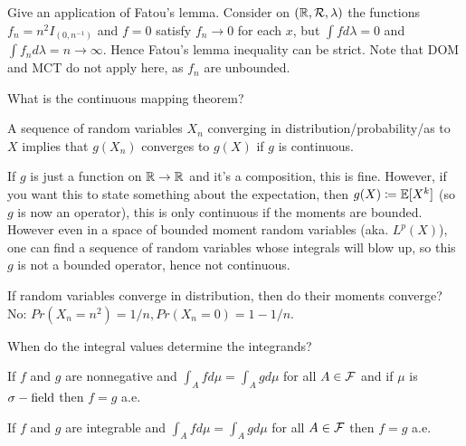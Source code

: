 \documentclass[avery5388,grid,frame]{flashcards}
\begin{document}
\begin{flashcard}
    {Give an application of Fatou's lemma.}
    Consider on $(\mathbb{R}, \mathcal R, \lambda)$ the functions $f_n = n^2 I_{(0,n^{-1})}$ and $f = 0$ satisfy $f_n \rightarrow 0$ for each $x$, but $\int f d\lambda = 0$ and $\int f_n d\lambda = n \rightarrow \infty$. Hence Fatou's lemma inequality can be strict. Note that DOM and MCT do not apply here, as $f_n$ are unbounded.
\end{flashcard}


\begin{flashcard}
    {What is the continuous mapping theorem?}
    \begin{theorem}
        A sequence of random variables $X_n$ converging in distribution/probability/as to $X$ implies that $g(X_n)$ converges to $g(X)$ if $g$ is continuous.
    \end{theorem}

    \begin{remark}
        If $g$ is just a function on $\mathbb{R} \rightarrow \mathbb{R}$ and it's a composition, this is fine. However, if you want this to state something about the expectation, then $g(X) \coloneqq \mathbb{E}[X^k]$ (so $g$ is now an operator), this is only continuous if the moments are bounded. However even in a space of bounded moment random variables (aka. $L^p(X)$), one can find a sequence of random variables whose integrals will blow up, so this $g$ is not a bounded operator, hence not continuous.
    \end{remark}
    \begin{remark}
        If random variables converge in distribution, then do their moments converge? No:
        $Pr(X_n = n^2) = 1/n, Pr(X_n = 0) = 1 - 1/n.$
    \end{remark}
\end{flashcard}


\begin{flashcard}
    {When do the integral values determine the integrands?}
    \begin{theorem}
        If $f$ and $g$ are nonnegative and $\int_A f d\mu = \int_A g d\mu$ for all $A \in \mathcal F$ and if $\mu$ is $\sigma-\text{field}$ then $f = g$ a.e.
    \end{theorem}
    \begin{theorem}
        If $f$ and $g$ are integrable and $\int_A f d\mu = \int_A g d\mu$ for all $A \in \mathcal F$ then $f = g$ a.e.
    \end{theorem}
\end{flashcard}
\end{document}
